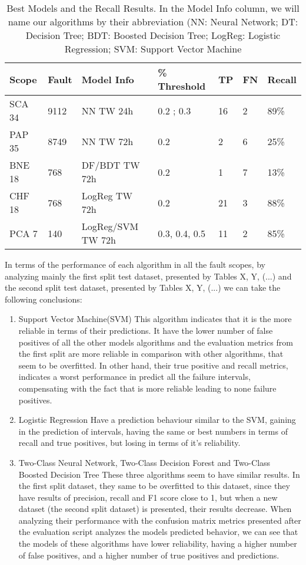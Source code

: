 \begin{table}[!ht]
    \centering
    \begin{tabular}{|l|l|l|l|l|l|l|}
    \hline
        Scope & Fault & Model Info & \% Threshold & TP & FN & Recall \\ \hline
        SCA 34 & 9112 & NN TW 24h & 0.2 ; 0.3 & 16 & 2 & 89\% \\ \hline
        PAP 35 & 8749 & NN TW 72h & 0.2 & 2 & 6 & 25\% \\ \hline
        BNE 18 & 768 & DF/BDT TW 72h & 0.2 & 1 & 7 & 13\% \\ \hline
        CHF 18 & 768 & LogReg TW 72h & 0.2 & 21 & 3 & 88\% \\ \hline
        PCA 7 & 140 & LogReg/SVM TW 72h & 0.3, 0.4, 0.5 & 11 & 2 & 85\% \\ \hline
    \end{tabular}
    \caption{Best Models and the Recall Results. In the Model Info column, we will name our algorithms by their abbreviation (NN: Neural Network; DT: Decision Tree; BDT: Boosted Decision Tree; LogReg: Logistic Regression; SVM: Support Vector Machine}
\end{table}

In terms of the performance of each algorithm in all the fault scopes, by analyzing mainly the first split test dataset, presented by Tables X, Y, (...) and the second split test dataset, presented by Tables X, Y, (...) we can take the following conclusions:
\begin{enumerate}
    \item{Support Vector Machine(SVM)}
This algorithm indicates that it is the more reliable in terms of their predictions. It have the lower number of false positives of all the other models algorithms and the evaluation metrics from the first split are more reliable in comparison with other algorithms, that seem to be overfitted.
In other hand, their true positive and recall metrics, indicates a worst performance in predict all the failure intervals, compensating with the fact that is more reliable leading to none failure positives.
    \item{Logistic Regression}
Have a prediction behaviour similar to the SVM, gaining in the prediction of intervals, having the same or best numbers in terms of recall and true positives, but losing in terms of it's reliability.
    \item{Two-Class Neural Network, Two-Class Decision Forest and Two-Class Boosted Decision Tree}
These three algorithms seem to have similar results. In the first split dataset, they same to be overfitted to this dataset, since they have results of precision, recall and F1 score close to 1, but when a new dataset (the second split dataset) is presented, their results decrease. When analyzing their performance with the confusion matrix metrics presented after the evaluation script analyzes the models predicted behavior, we can see that the models of these algorithms have lower reliability, having a higher number of false positives, and a higher number of true positives and predictions.
\end{enumerate}

